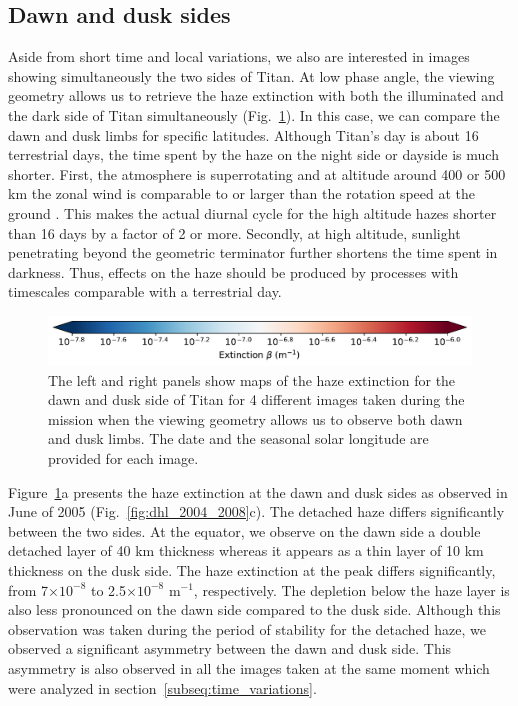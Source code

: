 \subsection{Dawn and dusk sides}

Aside from short time and local variations, we also are interested in images showing simultaneously the two sides
of Titan. At low phase angle, the viewing geometry allows us to retrieve the haze extinction with both the
illuminated and the dark side of Titan simultaneously  (Fig.~\ref{fig:dawn_dusk}).
In this case, we can compare the dawn and dusk limbs for
specific latitudes. Although Titan's day is about 16 terrestrial
days, the time spent by the haze on the night side or dayside is much shorter.
First, the atmosphere is superrotating and at altitude around 400 or 500 km the zonal wind is comparable to or
larger than the rotation speed at the ground \citep{Flasar2005, Achterberg2011, Lebonnois2012, Lellouch2019}.
This makes the actual diurnal cycle for the high altitude hazes shorter than 16 days by a factor of 2 or more.
Secondly, at high altitude, sunlight penetrating beyond the geometric terminator further shortens the time spent in darkness.
Thus, effects on the haze should be produced by processes with timescales
comparable with a terrestrial day.

\begin{figure}[!ht]
\includegraphics[width=.5\textwidth]{Fig/Extinction_colorbar}
\caption{The left and right panels show maps of the haze extinction for the dawn and dusk side of
Titan for 4 different images taken during the mission when the viewing geometry allows us to observe both dawn and dusk
limbs. The date and the seasonal solar longitude are provided for each image.}
\label{fig:dawn_dusk}
\end{figure}

Figure~\ref{fig:dawn_dusk}a presents the haze extinction at the dawn and dusk sides as observed
in June of 2005 (Fig.~\ref{fig:dhl_2004_2008}c). The detached haze differs significantly between the two sides.
At the equator, we observe on the dawn side a double detached layer of 40 km thickness whereas it appears
as a thin layer of 10 km thickness on the dusk side. The haze extinction at the peak differs significantly,
from 7$\times 10^{-8}$ to 2.5$\times 10^{-8}$ m$^{-1}$, respectively. The depletion below the haze layer
is also less pronounced on the dawn side compared to the dusk side. Although this observation was taken
during the period of stability for the detached haze, we observed a significant asymmetry between
the dawn and dusk side. This asymmetry is also observed in all the images taken at the same moment which were
analyzed in section~\ref{subseq:time_variations}.

